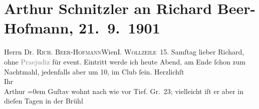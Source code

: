 

         
         \renewcommand{\erwaehntePersonen}{Personen: Richard Beer-Hofmann, Gustav Schwarzkopf}
         \renewcommand{\erwaehnteInstitutionen}{Institutionen: Wiener Schachclub}
         \renewcommand{\erwaehnteOrte}{Orte: Brühl, I., Innere Stadt, Tiefer Graben, Wien, Wollzeile}
         \renewcommand{\erwaehnteWerke}{}
               \section[Arthur Schnitzler an Richard Beer-Hofmann, 21. 9. 1901]{ Arthur Schnitzler an Richard Beer-Hofmann, 21. 9. 1901}\nopagebreak{}\rehead{ }\begin{ledgroupsized}[t]{13cm}\normalsize\beginnumbering \toendnotes[C]{\smallbreak\pagebreak[2]} 
\toendnotes[C]{\smallbreak}\pstart{}{\pb}Herrn Dr. \textsc{Rich.
                            Beer-Hofmann}\pend{}\pstart{}Wien\pend{}\pstart{}\textsc{I. Wollzeile 15.}\pend{}{\bigskip}\pstart
           \raggedleft{}{\pb}Samſtag\pend
           \pstart
           lieber Richard, ohne \textcolor{gray}{Praejudiz} für event.
                    Eintritt werde ich heute Abend, am Ende ſchon zum Nachtmahl, jedenfalls aber um
                        10, im Club
                    ſein.\pend
           \pstart
           Herzlichſt{\\[\baselineskip]}Ihr{\\[\baselineskip]}\spacefill\mbox{Arthur}\pend
           \leftskip=0em{}\pstart
           \noindent{}Guſtav wohnt nach wie vor Tief. Gr. 23; vielleicht iſt er aber in
                        dieſen Tagen in der Brühl\pend
           
         
         \endnumbering{}\end{ledgroupsized}  \newcommand{\dateiname}{L01175}\newcommand{\titel}{Arthur Schnitzler an Richard Beer-Hofmann, 21. 9. 1901}\newcommand{\editorInnen}{Martin Anton Müller und Gerd-Hermann Susen}
      